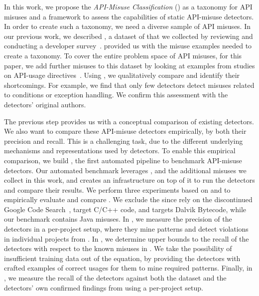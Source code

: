 
In this work, we propose the \textit{API-Misuse Classification} (\MUC) as a taxonomy for API misuses and a framework to assess the capabilities of static API-misuse detectors.
In order to create such a taxonomy, we need a diverse sample of API misuses.
In our previous work, we described \MUBench, a dataset of  that we collected by reviewing  and conducting a developer survey~\cite{ANNN+16}.
\MUBench provided us with the misuse examples needed to create a taxonomy.
To cover the entire problem space of API misuses, for this paper, we add further misuses to this dataset by looking at examples from studies on API-usage directives~\cite{DH09,METM12}. 
Using \MUC, we qualitatively compare  and identify their shortcomings.
For example, we find that only few detectors detect misuses related to conditions or exception handling.
We confirm this assessment with the detectors' original authors.

The previous step provides us with a conceptual comparison of existing detectors.
We also want to compare these API-misuse detectors empirically, by both their precision and recall.
This is a challenging task, due to the different underlying mechanisms and representations used by detectors.
To enable this empirical comparison, we build \MUPipe, the first automated pipeline to benchmark API-misuse detectors.
Our automated benchmark leverages \MUBench, and the additional misuses we collect in this work, and creates an infrastructure on top of it to run the detectors and compare their results.
We perform three experiments based on  and  to empirically evaluate and compare .
We exclude the  since  rely on the discontinued Google Code Search~\cite{farewellGoogle},  target C/C++ code, and  targets Dalvik Bytecode, while our benchmark contains Java misuses. 
%
In , we measure the precision of the detectors in a per-project setup, where they mine patterns and detect violations in individual projects from \MUBench.
%
In , we determine upper bounds to the recall of the detectors with respect to the known misuses in \MUBench.
We take the possibility of insufficient training data out of the equation, by providing the detectors with crafted examples of correct usages for them to mine required patterns.
%
Finally, in , we measure the recall of the detectors against both the \MUBench dataset and the detectors' own confirmed findings from  using a per-project setup.

